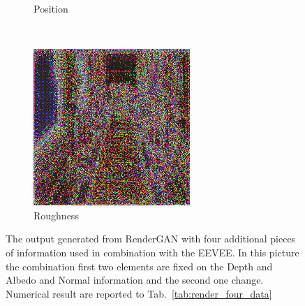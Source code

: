 \begin{figure}[h!]
\begin{subfigure}[b]{0.175\textwidth}
     \caption{Position}
    \end{subfigure}
    ~
    \begin{subfigure}[b]{0.175\textwidth}
     \includegraphics[width=\textwidth]{figures/result/quadruple/depth_albedo_normal_roughness/2.png}
     \caption{Roughness}\label{subfig:1}
    \end{subfigure}
    
    \caption[Generation Result with fixed input on Depth and Albedo]{The output generated from RenderGAN with four additional pieces of information used in combination with the EEVEE. In this picture the combination first two elements are fixed on the Depth and Albedo and Normal information and the second one change. Numerical result are reported to Tab.~\ref{tab:render_four_data}}
    \label{fig:quadruple_input_base_depth_albedo}
\end{figure}

